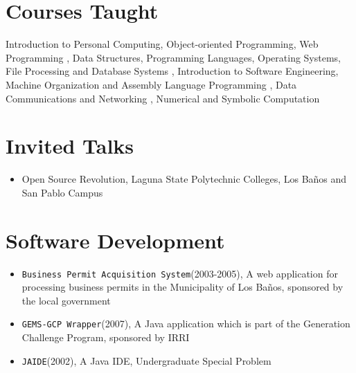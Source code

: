 \documentclass[overlapped,line,letterpaper]{res}
\begin{document}
\begin{resume}
\section{\bf Courses Taught}
Introduction to Personal Computing, Object-oriented Programming, Web Programming
, Data Structures, Programming Languages, Operating Systems, File Processing and Database Systems
, Introduction to Software Engineering, Machine Organization and Assembly Language Programming
, Data Communications and Networking
, Numerical and Symbolic Computation

\section{\bf Invited Talks}
\begin{itemize}
\item Open Source Revolution, Laguna State Polytechnic Colleges, Los Ba\~{n}os and
San Pablo Campus
\end{itemize}

\section{\bf Software Development}
\begin{itemize}
\item {\texttt{Business Permit Acquisition System}}(2003-2005), A web application for processing business permits in the
Municipality of Los Ba\~{n}os, sponsored by the local government
\item {\texttt{GEMS-GCP Wrapper}}(2007), A Java application which is part of the Generation Challenge Program,
sponsored by IRRI
\item {\texttt{JAIDE}}(2002), A Java IDE, Undergraduate Special Problem

\end{itemize}





\end{resume}
\end{document}

